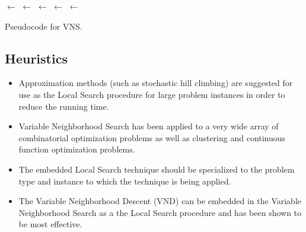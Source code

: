 \begin{algorithm}[htp]
	\SetLine

	\KwIn{\Neighborhoods}
	\KwOut{\Best}
	\Best $\leftarrow$ \RandomSolution{}\;
	\While{$\neg$ \StopCondition{}} {
		\ForEach{\CurrentNeighborhood $\in$ \Neighborhoods} {
			\Neighborhood $\leftarrow$ \CalculateNeighborhood{\Best, \CurrentNeighborhood}\;
			\Candidate $\leftarrow$ \RandomSolutionInNeighborhood{\Neighborhood}\;
			\Candidate $\leftarrow$ \LocalSearch{\Candidate}\;
			\If{\Cost{\Candidate} $<$ \Cost{\Best}} {
				\Best $\leftarrow$ \Candidate\;
				\Break\;
			}
		}
	}
	\Return{\Best}\;
	\caption{Pseudocode for VNS.}
	\label{alg:variable_neighborhood_search}
\end{algorithm}

\subsection{Heuristics}
\begin{itemize} 
	\item Approximation methods (such as stochastic hill climbing) are suggested for use as the Local Search procedure for large problem instances in order to reduce the running time.
	\item Variable Neighborhood Search has been applied to a very wide array of combinatorial optimization problems as well as clustering and continuous function optimization problems.
	\item The embedded Local Search technique should be specialized to the problem type and instance to which the technique is being applied. 
	\item The Variable Neighborhood Descent (VND) can be embedded in the Variable Neighborhood Search as a the Local Search procedure and has been shown to be most effective.
\end{itemize}

